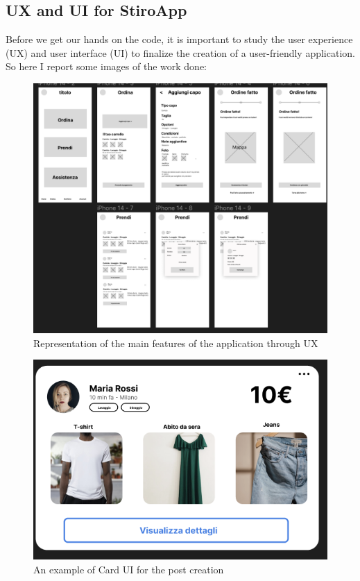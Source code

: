 \subsection{UX and UI for StiroApp}
Before we get our hands on the code, it is important to study the user experience (UX) and user interface (UI) to finalize the creation of a user-friendly application.
So here I report some images of the work done:
\begin{figure}[hbtp]
\caption{Representation of the main features of the application through UX}
\centering
\includegraphics[scale=0.5]{../Images/ux.png}
\end{figure}
\begin{figure}[hbtp]
\caption{An example of Card UI for the post creation}
\centering
\includegraphics[scale=0.5]{../Images/cardui.png}
\end{figure}
